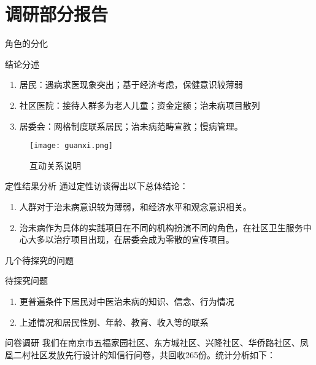 \section{调研部分报告}

\begin{frame}{角色的分化}
\begin{alertblock}{结论分述}
\begin{enumerate}
\item 居民：遇病求医现象突出；基于经济考虑，保健意识较薄弱

\item 社区医院：接待人群多为老人儿童；资金定额；治未病项目散列

\item 居委会：网格制度联系居民；治未病范畴宣教；慢病管理。
\end{enumerate}
\end{alertblock}
\begin{figure}[h]
    \texttt{[image: guanxi.png]}
    \centering
    \caption{互动关系说明}
\end{figure}
\end{frame}

\begin{frame}{定性结果分析}
通过定性访谈得出以下总体结论：
\begin{enumerate}
    \item 人群对于治未病意识较为薄弱，和经济水平和观念意识相关。
    \item 治未病作为具体的实践项目在不同的机构扮演不同的角色，在社区卫生服务中心大多以治疗项目出现，在居委会成为零散的宣传项目。
\end{enumerate}
\end{frame}

\begin{frame}{几个待探究的问题}
\begin{exampleblock}{待探究问题}

\begin{enumerate}
    \item 更普遍条件下居民对中医治未病的知识、信念、行为情况
    \item 上述情况和居民性别、年龄、教育、收入等的联系
\end{enumerate}\end{exampleblock}
\begin{alertblock}{问卷调研}
    我们在南京市五福家园社区、东方城社区、兴隆社区、华侨路社区、凤凰二村社区发放先行设计的知信行问卷，共回收265份。统计分析如下：
\end{alertblock}
\end{frame}

